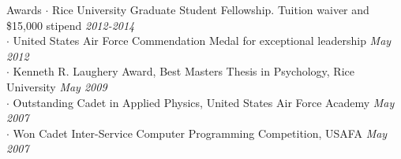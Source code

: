 
\begin{rSection}{Awards}
  $\cdot$ Rice University Graduate Student Fellowship. Tuition waiver and \$15,000 stipend
  \hfill {\em 2012-2014} \\
  $\cdot$ United States Air Force Commendation Medal for exceptional leadership 
  \hfill {\em May 2012} \\
  $\cdot$ Kenneth R. Laughery Award, Best Masters Thesis in Psychology, Rice University
  \hfill {\em May 2009} \\
  $\cdot$ Outstanding Cadet in Applied Physics, United States Air Force Academy
  \hfill {\em May 2007} \\
  $\cdot$ Won Cadet Inter-Service Computer Programming Competition, USAFA
  \hfill {\em May 2007}
\end{rSection}
